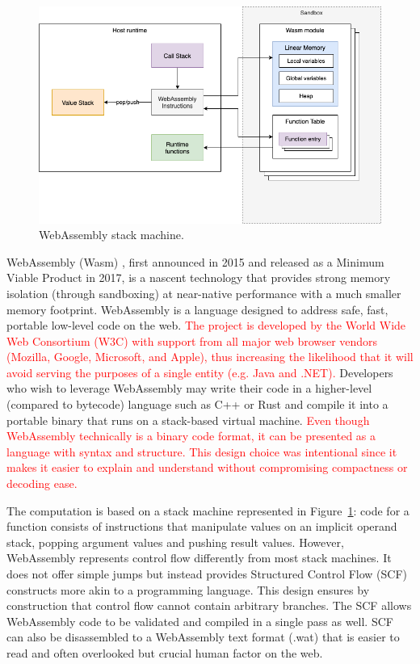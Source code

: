 \begin{figure}[ht]
\centering
\includegraphics[width=\columnwidth]{figures/webassembly}
\caption{WebAssembly stack machine.} \label{fig:webassembly}
\end{figure}

WebAssembly (Wasm) \cite{haas2017bringing}, first announced in 2015 and released as a Minimum Viable Product in 2017, is a nascent technology that provides strong memory isolation (through sandboxing) at near-native performance with a much smaller memory footprint. WebAssembly is a language designed to address safe, fast, portable low-level code on the web. \textcolor{red}{The project is developed by the World Wide Web Consortium (W3C) with support from all major web browser vendors (Mozilla, Google, Microsoft, and Apple), thus increasing the likelihood that it will avoid serving the purposes of a single entity (e.g. Java and .NET).} Developers who wish to leverage WebAssembly may write their code in a higher-level (compared to bytecode) language such as C++ or Rust and compile it into a portable binary that runs on a stack-based virtual machine. \textcolor{red}{Even though WebAssembly technically is a binary code format, it can be presented as a language with syntax and structure. This design choice was intentional since it makes it easier to explain and understand without compromising compactness or decoding ease.}


The computation is based on a stack machine represented in Figure~\ref{fig:webassembly}: code for a function consists of instructions that manipulate values on an implicit operand stack, popping argument values and pushing result values. However, WebAssembly represents control flow differently from most stack machines. It does not offer simple jumps but instead provides Structured Control Flow (SCF) constructs more akin to a programming language. This design ensures by construction that control flow cannot contain arbitrary branches. The SCF allows WebAssembly code to be validated and compiled in a single pass as well. SCF can also be disassembled to a WebAssembly text format (.wat) that is easier to read and often overlooked but crucial human factor on the web.

